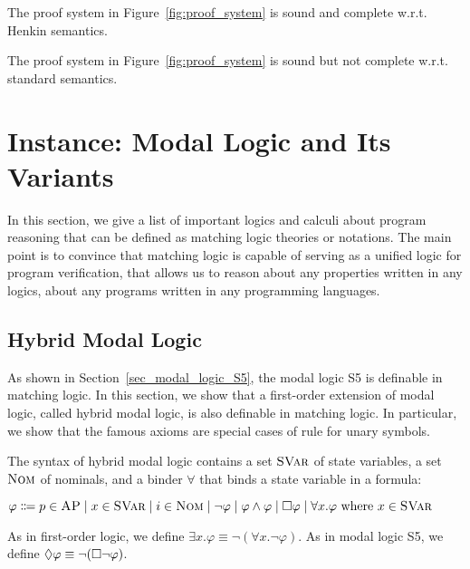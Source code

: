 \documentclass{amsart}
\begin{document}
\begin{theorem}
The proof system in Figure~\ref{fig:proof_system} is sound and complete
w.r.t. Henkin semantics.
\end{theorem}

\begin{theorem}
The proof system in Figure~\ref{fig:proof_system} is sound but not complete
w.r.t. standard semantics.
\end{theorem}


\section{Instance: Modal Logic and Its Variants}

In this section, we give a list of important logics and calculi about
program reasoning that can be defined as matching logic theories or notations.
The main point is to convince that matching logic is capable of
serving as a unified logic for program verification,
that allows us to reason about any properties written in any logics,
about any programs written in any programming languages.

\subsection{Hybrid Modal Logic}
\label{sec_hybrid_modal_logic}

As shown in Section~\ref{sec_modal_logic_S5},
the modal logic S5 is definable in matching logic.
In this section, we show that
a first-order extension of modal logic, called hybrid modal logic,
is also definable in matching logic.
In particular, we show that the famous  axioms are special cases
of rule \propagationexists for unary symbols.

The syntax of hybrid modal logic contains
a set ${\normalfont\textsc{SVar}}$ of state variables,
a set $\textnormal{\textsc{Nom}}$ of nominals,
and a binder $\forall$ that binds a state variable in a formula:
\begin{center}
	$\varphi \Coloneqq
	p \in \textsc{AP} \mid x \in {\normalfont\textsc{SVar}} \mid i \in \textnormal{\textsc{Nom}} \mid
	\neg \varphi \mid \varphi \wedge \varphi \mid
	{\square} \varphi \mid \forall x . \varphi \text{ where $x \in {\normalfont\textsc{SVar}}$}
	$
\end{center}
As in first-order logic,
we define $\exists x . \varphi \equiv \neg (\forall x . \neg \varphi)$.
As in modal logic S5,
we define ${\lozenge} \varphi \equiv \neg ({\square} \neg \varphi)$.
\end{document}
